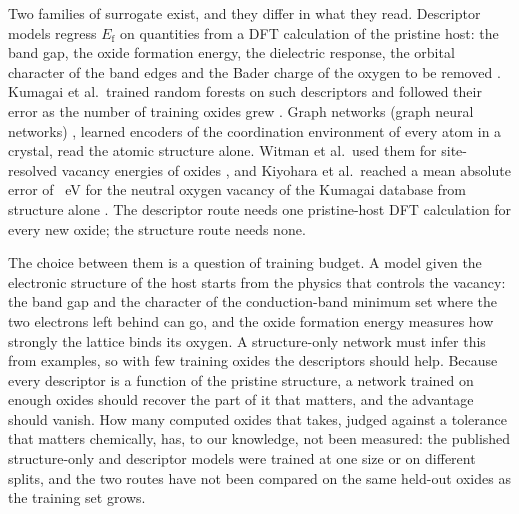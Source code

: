 Two families of surrogate exist, and they differ in what they read. Descriptor models regress $E_\mathrm{f}$ on quantities from a DFT calculation of the pristine host: the band gap, the oxide formation energy, the dielectric response, the orbital character of the band edges and the Bader charge of the oxygen to be removed \citep{Deml2014oxide,Deml2015intrinsic,Wexler2021factors}. Kumagai et al.\ trained random forests on such descriptors and followed their error as the number of training oxides grew \citep{Kumagai2021insights}. Graph networks (graph neural networks) \citep{Xie2018crystal,Chen2019graph}, learned encoders of the coordination environment of every atom in a crystal, read the atomic structure alone. Witman et al.\ used them for site-resolved vacancy energies of oxides \citep{Witman2023defect}, and Kiyohara et al.\ reached a mean absolute error of \numNetPublishedMae{}~eV for the neutral oxygen vacancy of the Kumagai database from structure alone \citep{Kiyohara2025machinelearning}. The descriptor route needs one pristine-host DFT calculation for every new oxide; the structure route needs none.

The choice between them is a question of training budget. A model given the electronic structure of the host starts from the physics that controls the vacancy: the band gap and the character of the conduction-band minimum set where the two electrons left behind can go, and the oxide formation energy measures how strongly the lattice binds its oxygen. A structure-only network must infer this from examples, so with few training oxides the descriptors should help. Because every descriptor is a function of the pristine structure, a network trained on enough oxides should recover the part of it that matters, and the advantage should vanish. How many computed oxides that takes, judged against a tolerance that matters chemically, has, to our knowledge, not been measured: the published structure-only and descriptor models were trained at one size or on different splits, and the two routes have not been compared on the same held-out oxides as the training set grows.

